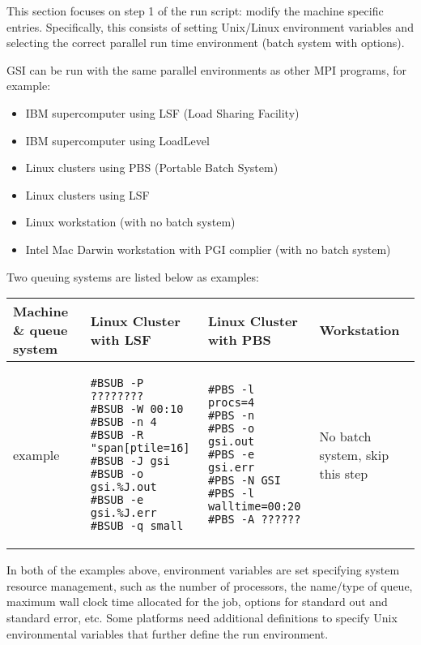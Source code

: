 
This section focuses on step 1 of the run script: modify the machine specific entries. Specifically, this consists of setting Unix/Linux environment variables and selecting the correct parallel run time environment (batch system with options). 

GSI can be run with the same parallel environments as other MPI programs, for example:

\begin{itemize}
\item IBM supercomputer using LSF (Load Sharing Facility)
\item IBM supercomputer using LoadLevel
\item Linux clusters using PBS (Portable Batch System)
\item Linux clusters using LSF
\item Linux workstation (with no batch system)
\item Intel Mac Darwin workstation with PGI complier (with no batch system)
\end{itemize}

Two queuing systems are listed below as examples:

\begin{table}[htbp]\centering
\begin{tabular}{|p{2.6cm}|p{4.5cm}|p{4.5cm}|p{2.5cm}|}
\hline
\hline
Machine \& queue system & Linux Cluster with LSF & Linux Cluster with PBS & Workstation \\
\hline
\hline
example
&
\begin{footnotesize}
\begin{verbatim}
#BSUB -P ???????? 
#BSUB -W 00:10 
#BSUB -n 4 
#BSUB -R "span[ptile=16]
#BSUB -J gsi 
#BSUB -o gsi.%J.out 
#BSUB -e gsi.%J.err 
#BSUB -q small
\end{verbatim}
\end{footnotesize}
&
\begin{footnotesize}
\begin{verbatim}
#PBS -l procs=4
#PBS -n
#PBS -o gsi.out
#PBS -e gsi.err
#PBS -N GSI
#PBS -l walltime=00:20
#PBS -A ??????
\end{verbatim}
\end{footnotesize}
&
No batch system, 
skip this step
\\
\hline
\end{tabular}
\label{t35}
\end{table} 

In both of the examples above, environment variables are set specifying system resource management, such as the number of processors, the name/type of queue, maximum wall clock time allocated for the job, options for standard out and standard error, etc. Some platforms need additional definitions to specify Unix environmental variables that further define the run environment. 

